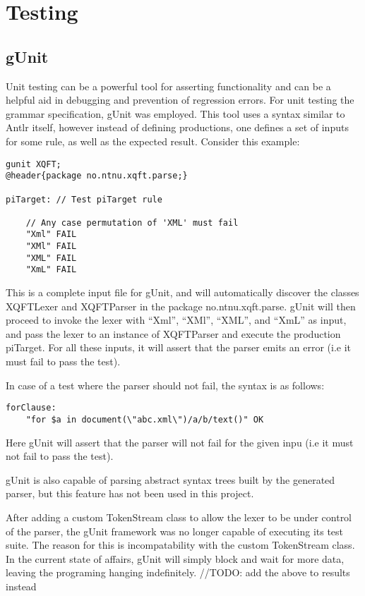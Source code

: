 \section{Testing}
\subsection{gUnit}
Unit testing can be a powerful tool for asserting functionality and can be a
helpful aid in debugging and prevention of regression errors.  For unit testing the
grammar specification, gUnit \cite{gunit00} was employed. This tool uses a
syntax similar to Antlr itself, however instead of defining productions, one
defines a set of inputs for some rule, as well as the expected result. Consider
this example:

\begin{verbatim}
gunit XQFT;
@header{package no.ntnu.xqft.parse;}

piTarget: // Test piTarget rule

    // Any case permutation of 'XML' must fail
    "Xml" FAIL
    "XMl" FAIL
    "XML" FAIL
    "XmL" FAIL
\end{verbatim}

This is a complete input file for gUnit, and will automatically discover the
classes XQFTLexer and XQFTParser in the package no.ntnu.xqft.parse. gUnit will
then proceed to invoke the lexer with ``Xml'', ``XMl'', ``XML'', and ``XmL'' as
input, and pass the lexer to an instance of XQFTParser and execute the production
piTarget. For all these inputs, it will assert that the parser emits an error
(i.e it must fail to pass the test).

In case of a test where the parser should not fail, the syntax is as follows:
\begin{verbatim}
forClause:
	"for $a in document(\"abc.xml\")/a/b/text()" OK
\end{verbatim}
Here gUnit will assert that the parser will not fail for the given inpu (i.e it
must not fail to pass the test).

gUnit is also capable of parsing abstract syntax trees built by the generated
parser, but this feature has not been used in this project.

After adding a custom TokenStream class to allow the lexer to be under control
of the parser, the gUnit framework was no longer capable of executing its test
suite. The reason for this is incompatability with the custom TokenStream class.
In the current state of affairs, gUnit will simply block and wait for more data,
leaving the programing hanging indefinitely. 
//TODO: add the above to results instead

